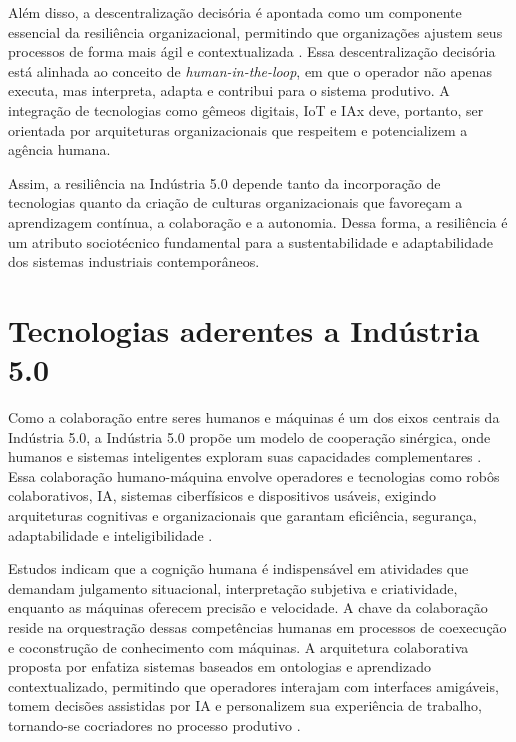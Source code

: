 Além disso, a descentralização decisória é apontada como um componente essencial da resiliência organizacional, permitindo que organizações ajustem seus processos de forma mais ágil e contextualizada \cite{PIZON2023, Nahavandi2019}.
Essa descentralização decisória está alinhada ao conceito de \textit{human-in-the-loop}, em que o operador não apenas executa, mas interpreta, adapta e contribui para o sistema produtivo. A integração de tecnologias como gêmeos digitais, \gls{IoT} e \gls{IAx} deve, portanto, ser orientada por arquiteturas organizacionais que respeitem e potencializem a agência humana.

Assim, a resiliência na Indústria 5.0 depende tanto da incorporação de tecnologias quanto da criação de culturas organizacionais que favoreçam a aprendizagem contínua, a colaboração e a autonomia.
Dessa forma, a resiliência é um atributo sociotécnico fundamental para a sustentabilidade e adaptabilidade dos sistemas industriais contemporâneos.

\section{Tecnologias aderentes a Indústria 5.0}


Como a colaboração entre seres humanos e máquinas é um dos eixos centrais da Indústria 5.0,  a Indústria 5.0 propõe um modelo de cooperação sinérgica, onde humanos e sistemas inteligentes exploram suas capacidades complementares \cite{Nahavandi2019, Santana_2023}.
Essa colaboração humano-máquina envolve operadores e tecnologias como robôs colaborativos, \gls{IA}, sistemas ciberfísicos e dispositivos usáveis, exigindo arquiteturas cognitivas e organizacionais que garantam eficiência, segurança, adaptabilidade e inteligibilidade \cite{TOTH2023, PIZON2023}.

Estudos indicam que a cognição humana é indispensável em atividades que demandam julgamento situacional, interpretação subjetiva e criatividade, enquanto as máquinas oferecem precisão e velocidade.
A chave da colaboração reside na orquestração dessas competências humanas em processos de coexecução e coconstrução de conhecimento \cite{TOTH2023} com máquinas.
A arquitetura colaborativa proposta por  enfatiza sistemas baseados em ontologias e aprendizado contextualizado, permitindo que operadores interajam com interfaces amigáveis, tomem decisões assistidas por \gls{IA} e personalizem sua experiência de trabalho, tornando-se cocriadores no processo produtivo \cite{TOTH2023, YANG2024}.

